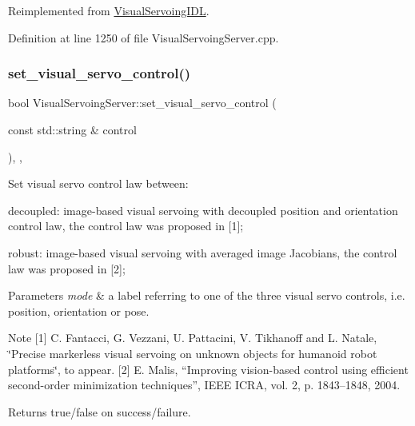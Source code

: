 Reimplemented from \hyperlink{classVisualServoingIDL_ad7800969fdb9a88cce5e59552fca8b1f}{Visual\+Servoing\+I\+DL}.



Definition at line 1250 of file Visual\+Servoing\+Server.\+cpp.

\mbox{\label{classVisualServoingServer_a2f28e67b1dd44d9afba4a79fd89f4bc8}} 
\subsubsection{\texorpdfstring{set\+\_\+visual\+\_\+servo\+\_\+control()}{set\_visual\_servo\_control()}}
{\footnotesize\ttfamily bool Visual\+Servoing\+Server\+::set\+\_\+visual\+\_\+servo\+\_\+control (\begin{DoxyParamCaption}\item[{const std\+::string \&}]{control }\end{DoxyParamCaption})\hspace{0.3cm}{\ttfamily [override]}, {\ttfamily [protected]}, {\ttfamily [virtual]}}



Set visual servo control law between\+: 


\begin{DoxyEnumerate}
\item \textquotesingle{}decoupled\textquotesingle{}\+: image-\/based visual servoing with decoupled position and orientation control law, the control law was proposed in \mbox{[}1\mbox{]};
\item \textquotesingle{}robust\textquotesingle{}\+: image-\/based visual servoing with averaged image Jacobians, the control law was proposed in \mbox{[}2\mbox{]}; 
\begin{DoxyParams}{Parameters}
{\em mode} & a label referring to one of the three visual servo controls, i.\+e. \textquotesingle{}position\textquotesingle{}, \textquotesingle{}orientation\textquotesingle{} or \textquotesingle{}pose\textquotesingle{}. \\
\hline
\end{DoxyParams}
\begin{DoxyNote}{Note}
\mbox{[}1\mbox{]} C. Fantacci, G. Vezzani, U. Pattacini, V. Tikhanoff and L. Natale, \char`\"{}\+Precise markerless visual servoing on unknown objects for
      humanoid robot platforms\char`\"{}, to appear. \mbox{[}2\mbox{]} E. Malis, “\+Improving vision-\/based control using efficient second-\/order minimization techniques”, I\+E\+EE I\+C\+RA, vol. 2, p. 1843–1848, 2004. 
\end{DoxyNote}
\begin{DoxyReturn}{Returns}
true/false on success/failure. 
\end{DoxyReturn}

\end{DoxyEnumerate}

